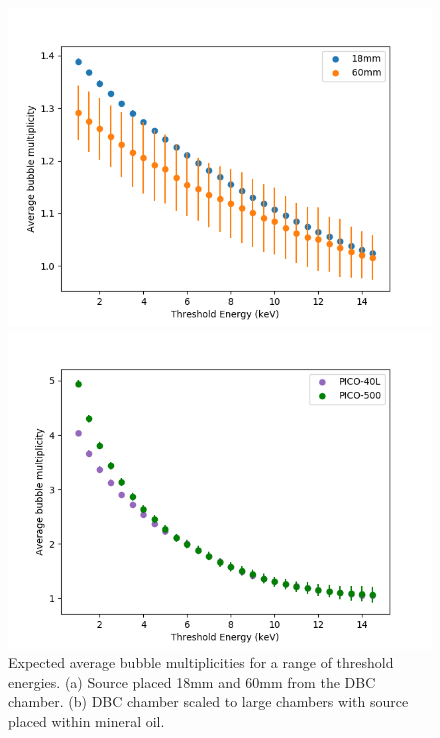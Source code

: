 \documentclass[%
12pt,
twoside,
reprint,
amsmath,amssymb,
aps,
]{article}
\begin{document}
	\begin{figure}[!b]
		\begin{minipage}{0.5\textwidth}
			\centering
			\includegraphics[width=1.1\linewidth]{Images/bubble_mult.png}
		\end{minipage}
		\begin{minipage}{0.5\textwidth}
			\centering
			\includegraphics[width=1.1\linewidth]{Images/large_chamber_bubble_mult.png}
		\end{minipage}
		\caption{\label{tab:table-name} Expected average bubble multiplicities for a range of threshold energies. (a) Source placed 18mm and 60mm from the DBC chamber. (b) DBC chamber scaled to large chambers with source placed within mineral oil.}
	\end{figure}
\end{document}
